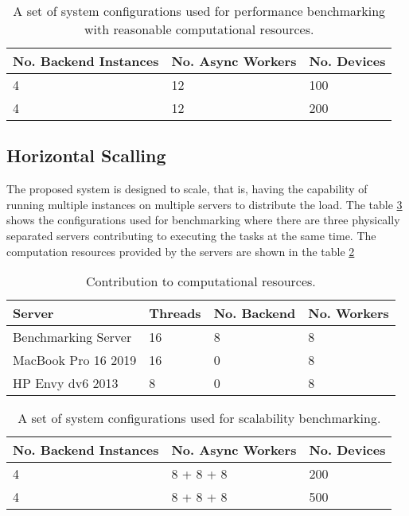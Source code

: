 \documentclass[../thesis.tex]{subfiles}
\begin{document}
\begin{table}[h!]
\begin{center}
\caption{A set of system configurations used for performance benchmarking with reasonable computational resources.}
\label{tab:highsysconfbench}
\begin{tabular}{l|l|l}
\toprule
\textbf{No. Backend Instances} & \textbf{No. Async Workers} & \textbf{No. Devices}\\
\midrule
4 & 12 & 100\\
4 & 12 & 200\\
\bottomrule
\end{tabular}
\end{center}
\end{table}

\subsection{Horizontal Scalling}

The proposed system is designed to scale, that is, having the capability of running multiple instances on multiple servers to distribute the load. The table \ref{tab:scalebench} shows the configurations used for benchmarking where there are three physically separated servers contributing to executing the tasks at the same time. The computation resources provided by the servers are shown in the table \ref{tab:computecontrib}

\begin{table}[h!]
\begin{center}
\caption{Contribution to computational resources.}
\label{tab:computecontrib}
\begin{tabular}{l|l|l|l}
\toprule
\textbf{Server} & \textbf{Threads} & \textbf{No. Backend} & \textbf{No. Workers}\\
\midrule
Benchmarking Server & 16 & 8 & 8\\
MacBook Pro 16 2019 & 16 & 0 & 8\\
HP Envy dv6 2013 & 8 & 0 & 8\\
\bottomrule
\end{tabular}
\end{center}
\end{table}

\begin{table}[h!]
\begin{center}
\caption{A set of system configurations used for scalability benchmarking.}
\label{tab:scalebench}
\begin{tabular}{l|l|l}
\toprule
\textbf{No. Backend Instances} & \textbf{No. Async Workers} & \textbf{No. Devices}\\
\midrule
4 & 8 + 8 + 8 & 200\\
4 & 8 + 8 + 8 & 500\\
\bottomrule
\end{tabular}
\end{center}
\end{table}
\end{document}

